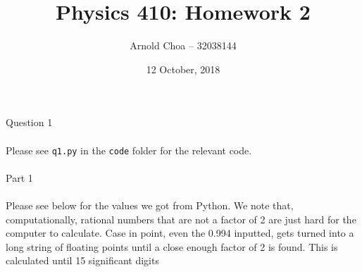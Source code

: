 \documentclass[10pt]{article} %
\title{Physics 410: Homework 2}
\author{Arnold Choa -- 32038144}
\date{12 October, 2018} %
\begin{document}
\maketitle
\vspace{-0.5cm}
\noindent \Large{Question 1}
\\ \\
\normalsize{Please see \texttt{q1.py} in the \texttt{code} folder for the relevant code.}
\\ \\
\noindent \large{Part 1}
\\ \\
\normalsize{Please see below for the values we got from Python. We note that, computationally, rational numbers that are not a factor of 2 are just hard for the computer to calculate. Case in point, even the 0.994 inputted, gets turned into a long string of floating points until a close enough factor of 2 is found. This is calculated until 15 significant digits}
\end{document}
